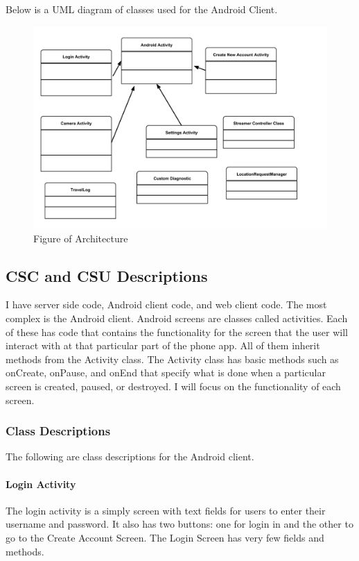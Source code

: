 \documentclass[11pt,a4paper,titlepage]{article}
\begin{document}
Below is a UML diagram of classes used for the Android Client.

\begin{figure}[H]
  \centering
  \includegraphics[width=5in]{img/android_classes}
  \caption{Figure of Architecture}
\end{figure}



\subsection{CSC and CSU Descriptions}
I have server side code, Android client code, and web client code. The most complex is the Android client.  Android screens are classes called activities. Each of these has code that contains the functionality for the screen that the user will interact with at that particular part of the phone app. All of them inherit methods from the Activity class. The Activity class has basic methods such as onCreate, onPause, and onEnd that specify what is done when a particular screen is created, paused, or destroyed. I will focus on the functionality of each screen.

\subsubsection{Class Descriptions}
The following are class descriptions for the Android client.
\paragraph{Login Activity\\}
The login activity is a simply screen with text fields for users to enter their username and password. It also has two buttons: one for login in and the other to go to the Create Account Screen. The Login Screen has very few fields and methods.
\\
\end{document}
